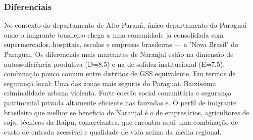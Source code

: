 \subsubsection*{Diferenciais}\label{dif-naranjal-1014}
No contexto do departamento de Alto Paraná, único departamento do Paraguai onde o imigrante brasileiro chega a uma comunidade já consolidada com supermercados, hospitais, escolas e empresas brasileiras — a 'Nova Brasil' do Paraguai. Os diferenciais mais marcantes de Naranjal estão na dimensão de autossuficiência produtiva (D=8.5) e na de solidez institucional (E=7.5), combinação pouco comum entre distritos de GSS equivalente. Em termos de segurança local: Uma das zonas mais seguras do Paraguai. Baixíssima criminalidade urbana violenta. Forte coesão social comunitária e segurança patrimonial privada altamente eficiente nas fazendas e. O perfil de imigrante brasileiro que melhor se beneficia de Naranjal é o de empresários, agricultores de soja, técnicos da Itaipu, comerciantes, que encontra aqui uma combinação de custo de entrada acessível e qualidade de vida acima da média regional.
